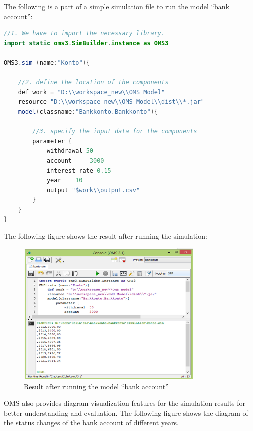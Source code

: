\par
The following is a part of a simple simulation file to run the model “bank account”:
\begin{lstlisting}[language=Java]
//1. We have to import the necessary library.
import static oms3.SimBuilder.instance as OMS3

OMS3.sim (name:"Konto"){

	//2. define the location of the components
	def work = "D:\\workspace_new\\OMS Model"
	resource "D:\\workspace_new\\OMS Model\\dist\\*.jar"
	model(classname:"Bankkonto.Bankkonto"){

		//3. specify the input data for the components
		parameter {
			withdrawal 50
			account 	3000
			interest_rate 0.15
			year 	10
			output "$work\\output.csv"
		}
	}
}
\end{lstlisting}
\par
The following figure shows the result after running the simulation:
\begin{figure}[h]
	\centering
	\includegraphics[width=0.8\textwidth]{pics/oms/Figure9.png}
	\caption{Result after running the model “bank account”
 \label{fig:Result_Bank_Account}}	
\end{figure}
\par
OMS also provides diagram visualization features for the simulation results for better understanding and evaluation. The following figure shows the diagram of the status changes of the bank account of different years.
